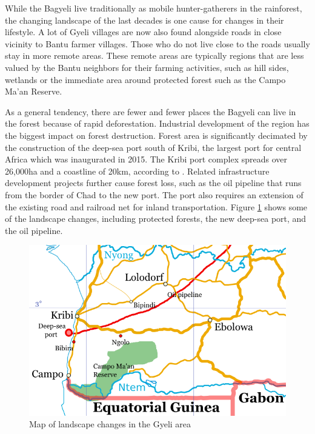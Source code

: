 While the Bagyeli live traditionally as mobile hunter-gatherers in the rainforest, the changing landscape of the last decades is one cause for changes in their lifestyle. A lot of Gyeli villages are now also found alongside roads in close vicinity to Bantu farmer villages. Those who do not live close to the roads usually stay in more remote areas. These remote areas are typically regions that are less valued by the Bantu neighbors for their farming activities, such as hill sides, wetlands or the immediate area around protected forest such as the Campo Ma'an Reserve. 

As a general tendency, there are fewer and fewer places the Bagyeli can live in the forest because of rapid deforestation. Industrial development of the region has the biggest impact on forest destruction. Forest area is significantly decimated by the construction of the deep-sea port south of Kribi, the largest port for central Africa which was inaugurated in 2015. The Kribi port complex spreads over 26,000ha and a coastline of 20km, according to \citet{ntaryike2015}.  Related infrastructure development projects further cause forest loss, such as the oil pipeline that runs from the border of Chad to the new port. The port also requires an extension of the existing road and railroad net for inland transportation. Figure \ref{Fig:Gyeli-env} shows some of the landscape  changes, including protected forests, the new deep-sea port, and the oil pipeline.

\begin{figure}[!h]
\includegraphics[width=\textwidth]{figures/Gyeli-env.png}
\caption{Map of landscape changes in the Gyeli area}
\label{Fig:Gyeli-env}
\end{figure}

